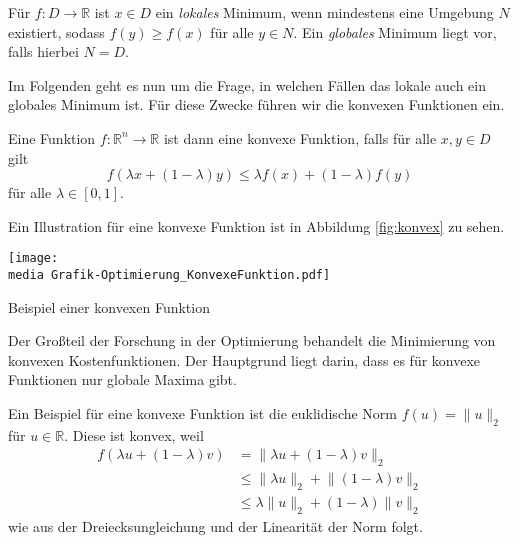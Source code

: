 \begin{Def}
Für $f: D\rightarrow \mathbb{R}$ ist $x\in D$ ein \emph{lokales} Minimum, wenn mindestens eine Umgebung $N$ existiert, sodass $f(y)\geq f(x)$ für alle $y\in N$.
Ein \emph{globales} Minimum liegt vor, falls hierbei $N=D$.
\end{Def}

Im Folgenden geht es nun um die Frage, in welchen F\"allen das lokale auch ein globales Minimum ist. F\"ur diese Zwecke f\"uhren wir die konvexen Funktionen ein.

\begin{Def}
Eine Funktion $f: \mathbb{R}^n\rightarrow\mathbb{R}$ ist dann eine konvexe Funktion, falls für alle $x, y\in D$ gilt
\begin{equation*}
  f(\lambda x+ (1 - \lambda)y) \leq \lambda f(x)+(1-\lambda)f(y)
\end{equation*}
für alle $\lambda \in [0, 1]$.
\end{Def}

Ein Illustration f\"ur eine konvexe Funktion ist in Abbildung \ref{fig:konvex} zu sehen. 
 \begin{dsafigure}
 \begin{center}
 \texttt{[image: \\media Grafik-Optimierung\_KonvexeFunktion.pdf]}
 \caption{Beispiel einer konvexen Funktion}
 \label{fig:konvex}
 \end{center}
\end{dsafigure}
Der Gro\ss teil der Forschung in der Optimierung behandelt die Minimierung von konvexen Kostenfunktionen. Der Hauptgrund liegt darin, dass es f\"ur konvexe Funktionen nur globale Maxima gibt. 


\begin{Bsp}
Ein Beispiel für eine konvexe Funktion ist die euklidische Norm $f(u) = \lVert u\rVert_2$ für $u\in\mathbb{R}$. Diese ist konvex, weil
\begin{align*}
f(\lambda u+(1-\lambda)v) &=\lVert\lambda u+(1-\lambda)v\rVert_2\\
&\leq\lVert\lambda u\rVert_2+\lVert(1-\lambda)v\rVert_2\\
&\leq\lambda\lVert u\rVert_2+(1-\lambda)\lVert v\rVert_2
\end{align*}
wie aus der Dreiecksungleichung und der Linearität der Norm folgt.
\end{Bsp}
